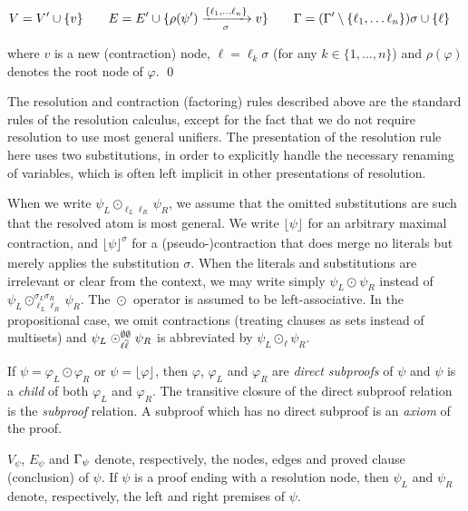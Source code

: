 \documentclass{llncs}
\newcommand{\Vertices}[1]{V_{#1}}
\newcommand{\Edges}[1]{E_{#1}}
\newcommand{\Conclusion}[1]{\clause_{#1}}
\newcommand{\n}{v}
\newcommand{\raiz}[1]{\rho(#1)}
\newcommand{\con}[3]{\lfloor #1 \rfloor_{#2}^{#3}}
\newcommand{\res}[4]{\mathrel{\operatorname*{\odot}_{#1 #3}^{#2 #4}}}
\begin{document}
\begin{definition}
\begin{itemize}
    \begin{small}
    \begin{align*}
      V &= V' \cup \{\n \} &\quad
      E &= E' \cup \{ \raiz{\psi'} \xrightarrow[\sigma]{\{\ell_1, \ldots \ell_n\}} \n \} 
      &\quad
     \Gamma &= (\clause' \setminus \{ \ell_1, \ldots \ell_n \} ) \sigma \cup \{ \ell \}
    \end{align*}
    \end{small}
    where $\n$ is a new (contraction) node, $\ell = \ell_k \sigma$ (for any $k \in \{1,\ldots, n\}$) and $\raiz{\varphi}$ denotes the root node of $\varphi$.
  \qed
\end{itemize}
\end{definition}


\noindent
The resolution and contraction (factoring) rules described above are the standard rules of the resolution calculus, except for the fact that we do not require resolution to use most general unifiers. The presentation of the resolution rule here uses two substitutions, in order to explicitly handle the necessary renaming of variables, which is often left implicit in other presentations of resolution.

When we write $\psi_L \res{\ell_L}{}{\ell_R}{} \psi_R$, we assume that the omitted substitutions are such that the resolved atom is most general. 
We write $\con{\psi}{}{}$ for an arbitrary maximal contraction, and $\con{\psi}{}{\sigma}$ for a (pseudo-)contraction that does merge no literals but merely applies the substitution $\sigma$. 
When the literals and substitutions are irrelevant or clear from the context, we may write simply $\psi_L \res{}{}{}{} \psi_R$ instead of $\psi_L \res{\ell_L}{\sigma_L}{\ell_R}{\sigma_R} \psi_R$.
The $\res{}{}{}{}$ operator is assumed to be left-associative. 
In the propositional case, we omit contractions (treating clauses as sets instead of multisets) and $\psi_L \res{\ell}{\emptyset}{\dual{\ell}}{\emptyset} \psi_R$ is abbreviated by $\psi_L \odot_{\ell} \psi_R$.

If $\psi = \varphi_L \odot \varphi_R$ or $\psi = \con{\varphi}{}{}$, then $\varphi$, $\varphi_L$ and $\varphi_R$ are \emph{direct
subproofs} of $\psi$ and $\psi$ is a \emph{child} of both $\varphi_L$ and $\varphi_R$. The
transitive closure of the direct subproof relation is the \emph{subproof} relation. A subproof which
has no direct subproof is an \emph{axiom} of the proof.

$\Vertices{\psi}$, $\Edges{\psi}$ and $\Conclusion{\psi}$
denote, respectively, the nodes, edges and proved clause (conclusion) of $\psi$. If $\psi$ is a proof ending with a resolution node, then $\psi_L$ and $\psi_R$ denote, respectively, the left and right premises of $\psi$.
\end{document}
